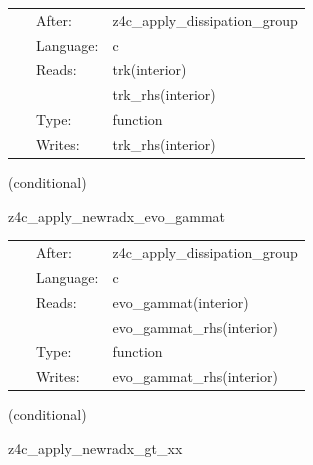 \hspace{5mm}

 \begin{tabular*}{160mm}{cll} 
~ & After:  & z4c\_apply\_dissipation\_group \\ 
~ & Language:  & c \\ 
~ & Reads:  & trk(interior) \\ 
~& ~ &trk\_rhs(interior)\\ 
~ & Type:  & function \\ 
~ & Writes:  & trk\_rhs(interior) \\ 
\end{tabular*} 


\vspace{5mm}

   (conditional) 

\hspace{5mm} z4c\_apply\_newradx\_evo\_gammat 



\hspace{5mm}

 \begin{tabular*}{160mm}{cll} 
~ & After:  & z4c\_apply\_dissipation\_group \\ 
~ & Language:  & c \\ 
~ & Reads:  & evo\_gammat(interior) \\ 
~& ~ &evo\_gammat\_rhs(interior)\\ 
~ & Type:  & function \\ 
~ & Writes:  & evo\_gammat\_rhs(interior) \\ 
\end{tabular*} 


\vspace{5mm}

   (conditional) 

\hspace{5mm} z4c\_apply\_newradx\_gt\_xx 



\hspace{5mm}

